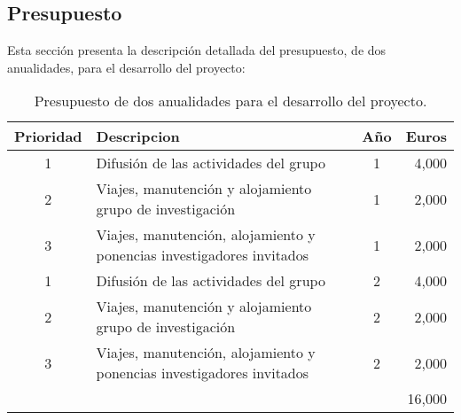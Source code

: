 \documentclass[10pt,a4paper]{paper}
\begin{document}
\subsection{Presupuesto} 
Esta sección presenta la descripción detallada del presupuesto, de dos anualidades, para el desarrollo del proyecto:

\begin{table}[hbt!]
\begin{small}  
  \begin{tabular}{clc|r}
    {\large\bf Prioridad} & {\large\bf Descripcion} & {\large\bf Año} & {\large\bf Euros} \\\hline
1 & {\scriptsize Difusión de las actividades del grupo} & 1 & 4,000\\    
2 & {\scriptsize Viajes, manutención y alojamiento grupo de investigación} & 1 & 2,000\\
3 & {\scriptsize Viajes, manutención, alojamiento y ponencias investigadores invitados} & 1 & 2,000\\\hline
1 & {\scriptsize Difusión de las actividades del grupo} & 2 & 4,000\\    
2 & {\scriptsize Viajes, manutención y alojamiento grupo de investigación} & 2 & 2,000\\
3 & {\scriptsize Viajes, manutención, alojamiento y ponencias investigadores invitados} & 2 & 2,000\\\hline
\multicolumn{3}{l|}{} & 16,000 \\
  \end{tabular}
\end{small}
\caption{\small Presupuesto de dos anualidades para el desarrollo del proyecto.}
\end{table}
\end{document}

